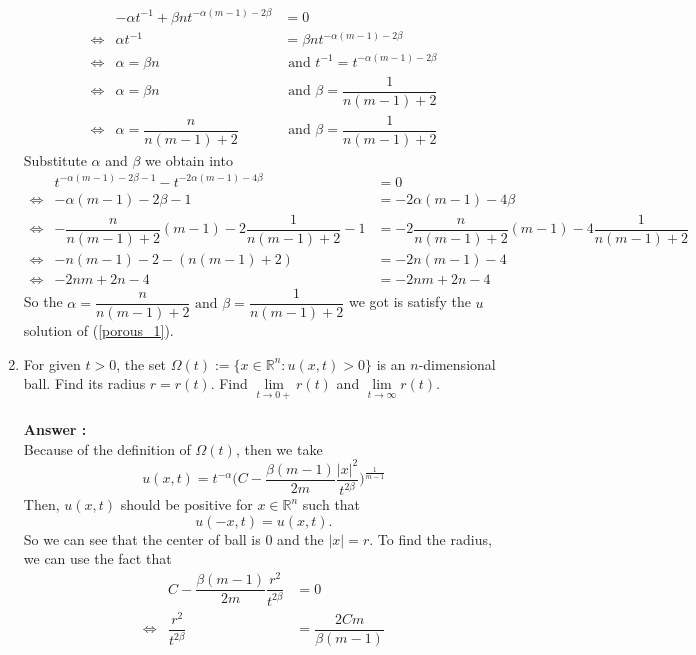 \documentclass[a4paper,10pt]{article}
\newcommand{\R}{\mathbb{R}}
\begin{document}
\begin{enumerate}
	\begin{eqnarray}\nonumber
	&-\alpha t^{-1} + \beta n t^{-\alpha(m-1)-2\beta} &=0 \\ \nonumber
	\Leftrightarrow & \alpha t^{-1} &= \beta n t^{-\alpha(m-1)-2\beta} \\ \nonumber
	\Leftrightarrow & \alpha = \beta n &\text{ and } t^{-1} = t^{-\alpha(m-1)-2\beta}\\ \nonumber
	\Leftrightarrow &\alpha = \beta n &\text{ and }  \beta = \dfrac{1}{n(m-1)+2}\\ \nonumber
	\Leftrightarrow &\alpha = \dfrac{n}{n(m-1)+2} &\text{ and }  \beta = \dfrac{1}{n(m-1)+2}
	\end{eqnarray}
	Substitute $ \alpha $ and $ \beta $ we obtain into
	\begin{eqnarray}\nonumber
	&t^{-\alpha(m-1)-2\beta-1}-t^{-2\alpha(m-1)-4\beta} &= 0 \\ \nonumber
	\Leftrightarrow& -\alpha(m-1)-2\beta-1 &= -2\alpha(m-1)-4\beta \\ \nonumber
	\Leftrightarrow& -\dfrac{n}{n(m-1)+2}(m-1)-2\dfrac{1}{n(m-1)+2}-1 &= -2 \dfrac{n}{n(m-1)+2}(m-1)-4\dfrac{1}{n(m-1)+2} \\ \nonumber
	\Leftrightarrow& -n(m-1)-2-(n(m-1)+2) &= -2n(m-1)-4 \\ \nonumber
	\Leftrightarrow& -2nm+2n-4 &= -2nm+2n-4
	\end{eqnarray}
	So the $ \alpha = \dfrac{n}{n(m-1)+2} \text{ and }  \beta = \dfrac{1}{n(m-1)+2} $ we got is satisfy the $ u $ solution of (\ref{porous_1}).
	\newpage
	\item For given $ t>0 $, the set $ \Omega(t):=\{ x\in\R^n: u(x,t)>0 \} $ is an $ n $-dimensional ball. Find its radius $ r=r(t) $. Find $ \lim\limits_{t\rightarrow 0+}r(t) $ and $ \lim\limits_{t\rightarrow \infty} r(t) $.\\ \\
	\textbf{Answer :}\\ 
	Because of the definition of $ \Omega(t) $, then we take
	\[ u(x,t) = t^{-\alpha}\big( C-\dfrac{\beta(m-1)}{2m} \dfrac{|x|^2}{t^{2\beta}} \big)^{\frac{1}{m-1}} \]
	Then, $ u(x,t) $ should be positive for $ x\in \R^n $ such that
	\[ u(-x,t) = u(x,t). \]
	So we can see that the center of ball is $ 0 $ and the $ |x| = r $. To find the radius, we can use the fact that
	\begin{eqnarray} \nonumber
	&C-\dfrac{\beta(m-1)}{2m} \dfrac{r^2}{t^{2\beta}} &= 0 \\ \nonumber
	\Leftrightarrow&\dfrac{r^2}{t^{2\beta}} &= \dfrac{2Cm}{\beta(m-1)} \\ \nonumber

\end{eqnarray}
\end{enumerate}
\end{document}
